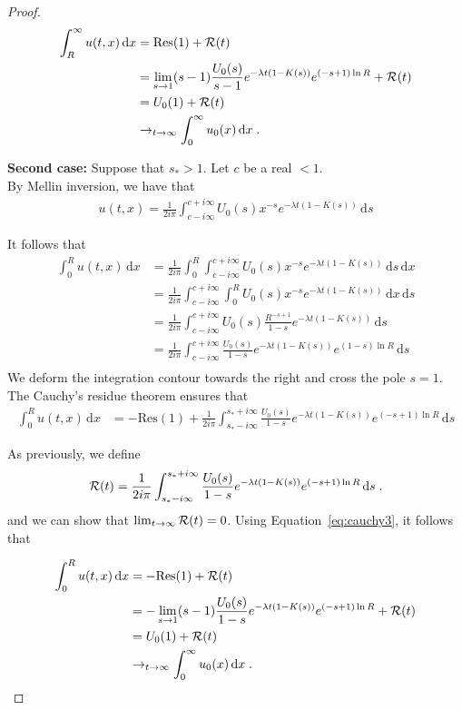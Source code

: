 \documentclass[11pt]{amsart}
\newcommand{\diff}{\,\mathrm{d}}
\begin{document}
\begin{proof}
\begin{align*}
    \int_R^\infty u(t,x) \diff x &= \mathrm{Res(1)} + \Rcal(t) \\
    &= \lim_{s \to 1} (s-1)\frac{U_0(s)}{s-1} e^{-\lambda t(1 - K(s))} e^{(-s+1)\ln R}  + \Rcal(t)\\
    &= U_0(1) + \Rcal(t)\\
    &\to_{t \to \infty} \int_0^\infty u_0(x) \diff x
    \eqfinp
\end{align*}

\textbf{Second case:} Suppose that $s_* > 1$. Let $c$ be a real $<1$. \\
By Mellin inversion, we have that
\begin{align*}
    u(t,x) = \frac{1}{2i\pi}\int_{c-i\infty}^{c+i\infty} U_0(s) x^{-s} e^{-\lambda t(1 - K(s))} \diff s
\end{align*}

It follows that
\begin{align*}
    \int_0^R u(t,x) \diff x 
    &= \frac{1}{2i\pi} \int_0^R \int_{c-i\infty}^{c+i\infty} U_0(s) x^{-s} e^{-\lambda t(1 - K(s))} \diff s \diff x \\
    &= \frac{1}{2i\pi} \int_{c-i\infty}^{c+i\infty} \int_0^R U_0(s) x^{-s} e^{-\lambda t(1 - K(s))} \diff x \diff s \\
    &= \frac{1}{2i\pi} \int_{c-i\infty}^{c+i\infty} U_0(s) \frac{R^{-s+1}}{1-s} e^{-\lambda t(1 - K(s))} \diff s \\
    &= \frac{1}{2i\pi} \int_{c-i\infty}^{c+i\infty} \frac{U_0(s)}{1-s} e^{-\lambda t(1 - K(s))} e^{(1-s)\ln R} \diff s \\
\end{align*}
We deform the integration contour towards the right and cross the pole $s = 1$. The Cauchy's residue theorem ensures that
\begin{align}
    \int_0^R u(t,x) \diff x &= -\mathrm{Res(1)} + \frac{1}{2i\pi} \int_{s_*-i\infty}^{s_*+i\infty} \frac{U_0(s)}{1-s} e^{-\lambda t(1 - K(s))} e^{(-s+1)\ln R} \diff s
    \label{eq:cauchy3}
\end{align}

As previously, we define
\begin{align*}
    \Rcal(t) = \frac{1}{2i\pi} \int_{s_*-i\infty}^{s_*+i\infty} \frac{U_0(s)}{1-s} e^{-\lambda t(1 - K(s))} e^{(-s+1)\ln R} \diff s
    \eqfinp
\end{align*}
and we can show that $\lim_{t\to\infty}\mathcal{R}(t) = 0$. Using Equation~\ref{eq:cauchy3}, it follows that 

\begin{align*}
    \int_0^R u(t,x) \diff x &= -\mathrm{Res(1)} + \Rcal(t) \\
    &= -\lim_{s \to 1} (s-1)\frac{U_0(s)}{1-s} e^{-\lambda t(1 - K(s))} e^{(-s+1)\ln R}  + \Rcal(t)\\
    &= U_0(1) + \Rcal(t)\\
    &\to_{t \to \infty} \int_0^\infty u_0(x) \diff x
    \eqfinp
\end{align*}
\end{proof}
\end{document}
